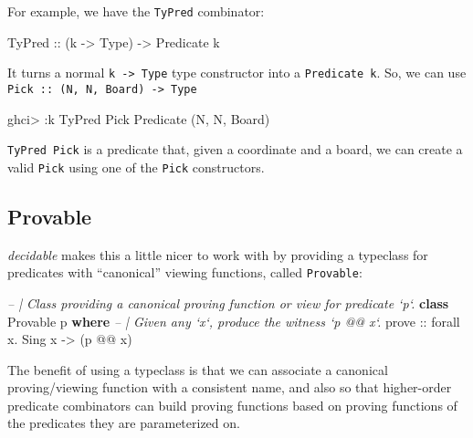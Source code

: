 \documentclass[]{article}
\newenvironment{Shaded}{}{}
\newcommand{\CommentTok}[1]{\textcolor[rgb]{0.38,0.63,0.69}{\textit{#1}}}
\newcommand{\DataTypeTok}[1]{\textcolor[rgb]{0.56,0.13,0.00}{#1}}
\newcommand{\FunctionTok}[1]{\textcolor[rgb]{0.02,0.16,0.49}{#1}}
\newcommand{\KeywordTok}[1]{\textcolor[rgb]{0.00,0.44,0.13}{\textbf{#1}}}
\newcommand{\NormalTok}[1]{#1}
\newcommand{\OtherTok}[1]{\textcolor[rgb]{0.00,0.44,0.13}{#1}}
\begin{document}
For example, we have the \texttt{TyPred} combinator:

\begin{Shaded}
\begin{Highlighting}[]
\DataTypeTok{TyPred}\OtherTok{ ::}\NormalTok{ (k }\OtherTok{->} \DataTypeTok{Type}\NormalTok{) }\OtherTok{->} \DataTypeTok{Predicate}\NormalTok{ k}
\end{Highlighting}
\end{Shaded}

It turns a normal \texttt{k\ -\textgreater{}\ Type} type constructor into a
\texttt{Predicate\ k}. So, we can use
\texttt{Pick\ ::\ (N,\ N,\ Board)\ -\textgreater{}\ Type}

\begin{Shaded}
\begin{Highlighting}[]
\NormalTok{ghci}\FunctionTok{>} \FunctionTok{:}\NormalTok{k }\DataTypeTok{TyPred} \DataTypeTok{Pick}
\DataTypeTok{Predicate}\NormalTok{ (}\DataTypeTok{N}\NormalTok{, }\DataTypeTok{N}\NormalTok{, }\DataTypeTok{Board}\NormalTok{)}
\end{Highlighting}
\end{Shaded}

\texttt{TyPred\ Pick} is a predicate that, given a coordinate and a board, we
can create a valid \texttt{Pick} using one of the \texttt{Pick} constructors.

\hypertarget{provable}{%
\subsection{Provable}\label{provable}}

\emph{decidable} makes this a little nicer to work with by providing a typeclass
for predicates with ``canonical'' viewing functions, called \texttt{Provable}:

\begin{Shaded}
\begin{Highlighting}[]
\CommentTok{-- | Class providing a canonical proving function or view for predicate `p`.}
\KeywordTok{class} \DataTypeTok{Provable}\NormalTok{ p }\KeywordTok{where}
    \CommentTok{-- | Given any `x`, produce the witness `p @@ x`.}
\OtherTok{    prove ::}\NormalTok{ forall x}\FunctionTok{.} \DataTypeTok{Sing}\NormalTok{ x }\OtherTok{->}\NormalTok{ (p }\FunctionTok{@@}\NormalTok{ x)}
\end{Highlighting}
\end{Shaded}

The benefit of using a typeclass is that we can associate a canonical
proving/viewing function with a consistent name, and also so that higher-order
predicate combinators can build proving functions based on proving functions of
the predicates they are parameterized on.
\end{document}
